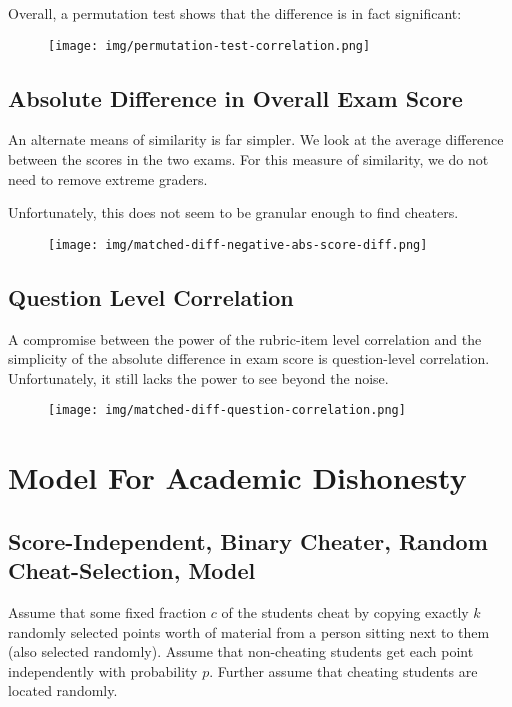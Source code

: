 \documentclass{article}
\begin{document}
        Overall, a permutation test shows that the difference is in fact significant:
        \begin{figure}[h!]
            \centering
            \texttt{[image: img/permutation-test-correlation.png]}
        \end{figure}
    \subsection{Absolute Difference in Overall Exam Score}
        An alternate means of similarity is far simpler. We look at the average difference
            between the scores in the two exams. For this measure of similarity, we do not need to
            remove extreme graders.

        Unfortunately, this does not seem to be granular enough to find cheaters.
        \begin{figure}[h!]
            \centering
            \texttt{[image: img/matched-diff-negative-abs-score-diff.png]}
        \end{figure}
    \subsection{Question Level Correlation}
        A compromise between the power of the rubric-item level correlation and the simplicity of
            the absolute difference in exam score is question-level correlation. Unfortunately, it
            still lacks the power to see beyond the noise.
        \begin{figure}[h!]
            \centering
            \texttt{[image: img/matched-diff-question-correlation.png]}
        \end{figure}
\section{Model For Academic Dishonesty}
    \subsection{Score-Independent, Binary Cheater, Random Cheat-Selection, Model}
        Assume that some fixed fraction $c$ of the students cheat by copying exactly $k$
            randomly selected points worth of material from a person sitting next to them (also
            selected randomly). Assume that non-cheating students get each point independently
            with probability $p$. Further assume that cheating students are located randomly.
\end{document}
